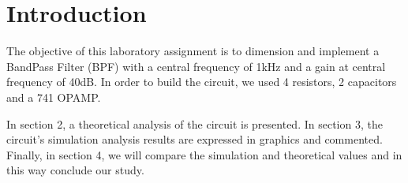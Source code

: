 \section{Introduction}
\label{sec:introduction}



The objective of this laboratory assignment is to dimension and implement a BandPass Filter (BPF) with a central frequency of 1kHz and a gain at central frequency of 40dB. 
In order to build the circuit, we used 4 resistors, 2 capacitors and a 741 OPAMP.
 

In section 2, a theoretical analysis of the circuit is presented. In section 3, the circuit's simulation analysis results are expressed in graphics and commented. Finally, in section 4, we will compare the simulation and theoretical values and in this way conclude our study.


